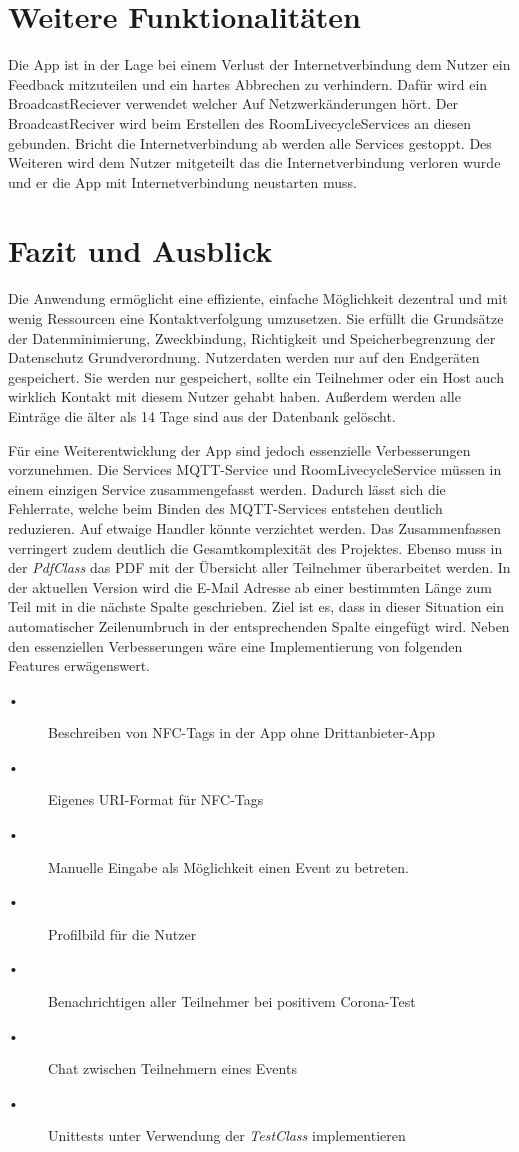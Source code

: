 \section{Weitere Funktionalitäten}
\label{sec:sonstiges}
Die App ist in der Lage bei einem Verlust der Internetverbindung dem Nutzer ein Feedback mitzuteilen und ein hartes Abbrechen zu verhindern. 
Dafür wird ein BroadcastReciever verwendet welcher Auf Netzwerkänderungen hört. 
Der BroadcastReciver wird beim Erstellen des RoomLivecycleServices an diesen gebunden.
 Bricht die Internetverbindung ab werden alle Services gestoppt. 
Des Weiteren wird dem Nutzer mitgeteilt das die Internetverbindung verloren wurde und er die App mit Internetverbindung neustarten muss.

\section{Fazit und Ausblick}
\label{sec:FuA}
Die Anwendung ermöglicht eine effiziente, einfache Möglichkeit dezentral und mit wenig Ressourcen eine Kontaktverfolgung umzusetzen.
Sie erfüllt die Grundsätze der Datenminimierung, Zweckbindung, Richtigkeit und Speicherbegrenzung der Datenschutz Grundverordnung. Nutzerdaten werden nur auf den Endgeräten gespeichert. 
Sie werden nur gespeichert, sollte ein Teilnehmer oder ein Host auch wirklich Kontakt mit diesem Nutzer gehabt haben. 
Außerdem werden alle Einträge die älter als 14 Tage sind aus der Datenbank gelöscht.

Für eine Weiterentwicklung der App sind jedoch essenzielle Verbesserungen vorzunehmen. Die Services MQTT-Service und RoomLivecycleService müssen in einem einzigen Service zusammengefasst werden. 
Dadurch lässt sich die Fehlerrate, welche beim Binden des MQTT-Services entstehen deutlich reduzieren. Auf etwaige Handler könnte verzichtet werden. 
Das Zusammenfassen verringert zudem deutlich die Gesamtkomplexität des Projektes.
 Ebenso muss in der \textit{PdfClass} das PDF mit der Übersicht aller Teilnehmer überarbeitet werden. 
 In der aktuellen Version wird die E-Mail Adresse ab einer bestimmten Länge zum Teil mit in die nächste Spalte geschrieben.
 Ziel ist es, dass in dieser Situation ein automatischer Zeilenumbruch in der entsprechenden Spalte eingefügt wird.
Neben den essenziellen Verbesserungen  wäre eine Implementierung von folgenden Features erwägenswert.
\begin{description}
\item[•]Beschreiben von NFC-Tags in der App ohne Drittanbieter-App
\item[•]Eigenes URI-Format für NFC-Tags 
\item[•]Manuelle Eingabe als Möglichkeit einen Event zu betreten.
\item[•]Profilbild für die Nutzer
\item[•]Benachrichtigen aller Teilnehmer bei positivem Corona-Test
\item[•]Chat zwischen Teilnehmern eines Events
\item[•]Unittests unter Verwendung der \textit{TestClass} implementieren
\end{description}



